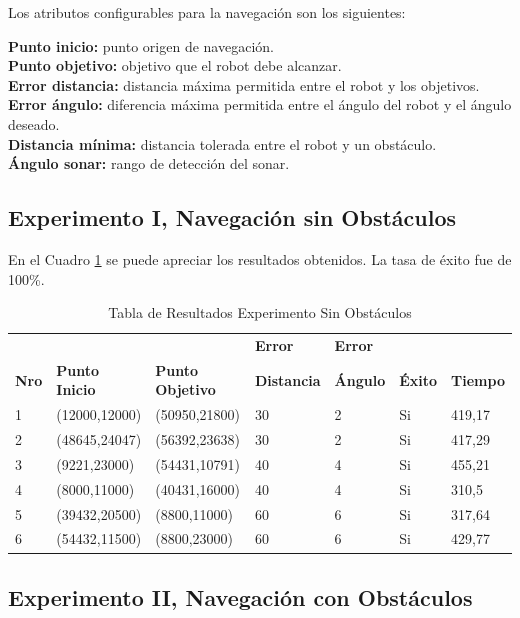 \documentclass[11pt,twoside,A5]{article}
\newcommand{\reftable}[1]{Cuadro \ref{#1}}
\begin{document}
Los atributos configurables para la navegación son los siguientes:

\noindent\textbf{Punto inicio:} punto origen de navegación.\\
\textbf{Punto objetivo:} objetivo que el robot debe alcanzar.\\
\textbf{Error distancia:} distancia máxima permitida entre el robot y los objetivos.\\
\textbf{Error ángulo:} diferencia máxima permitida entre el ángulo del robot y el ángulo deseado.\\
\textbf{Distancia mínima:} distancia tolerada entre el robot y un obstáculo.\\
\textbf{Ángulo sonar:} rango de detección del sonar.

\subsection*{Experimento I, Navegación sin Obstáculos}

En el \reftable{tab:experimento-1} se puede apreciar los resultados obtenidos. 
La tasa de éxito fue de 100\%.

\begin{table}[h]
\centering
\caption{Tabla de Resultados Experimento Sin Obstáculos}
\label{tab:experimento-1}
\tiny
\begin{tabular}{|l|l|l|l|l|l|l|} \hline
&&&\textbf{Error}&\textbf{Error}&& \\ 
\textbf{Nro}&	\textbf{Punto Inicio}	& \textbf{Punto Objetivo} &	\textbf{Distancia}	& \textbf{Ángulo} &	\textbf{Éxito} &	\textbf{Tiempo} \\ \hline
1&(12000,12000)&(50950,21800)&30&2&Si&419,17 \\ \hline
2&(48645,24047)&(56392,23638)&30&2&Si&417,29 \\ \hline
3&(9221,23000)&(54431,10791)&40&4&Si&455,21 \\ \hline
4&(8000,11000)&(40431,16000)&40&4&Si&310,5  \\ \hline
5&(39432,20500)&(8800,11000)&60&6&Si&317,64 \\ \hline
6&(54432,11500)&(8800,23000)&60&6&Si&429,77 \\ \hline
\end{tabular}
\end{table}

\subsection*{Experimento II, Navegación con Obstáculos}
\end{document}
